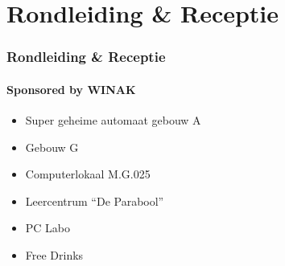 %    
%    
%

\section{Rondleiding \& Receptie}
\begin{frame}
	\frametitle{Rondleiding \& Receptie}
	\framesubtitle{Sponsored by WINAK}
    \begin{itemize}
    	\item Super geheime automaat gebouw A
       	\item Gebouw G
	    \item Computerlokaal M.G.025
        \item Leercentrum ``De Parabool''
        \item PC Labo
        \item Free Drinks
	\end{itemize}
\end{frame}
